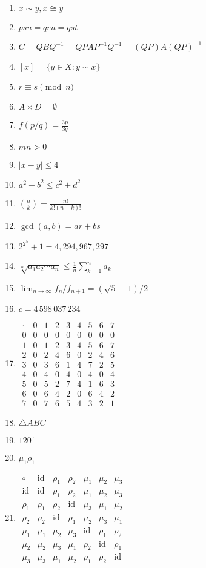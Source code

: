 \documentclass[oneside,10pt,]{article}
\newcommand{\identity}{\mathrm{id}}
\begin{document}
\begin{enumerate}
\item{}\(x \sim y, x\cong y\)%
\item{}\(psu = qru = qst\)%
\item{}\(C = QBQ^{-1} = QPAP^{-1} Q^{-1} = (QP)A(QP)^{-1}\)%
\item{}\([x] = \{ y \in X : y \sim x \}\)%
\item{}\(r \equiv s \pmod{ n}\)%
\item{}\(A \times D = \emptyset\)%
\item{}\(\displaystyle f(p/q) = \frac{3p}{3q}\)%
\item{}\(mn > 0\)%
\item{}\(|x - y| \leq 4\)%
\item{}\(a^2 + b^2 \leq c^2 + d^2\)%
\item{}\(\binom{n}{k} = \frac{n!}{k! (n - k)!}\)%
\item{}\(\gcd( a, b) = ar + bs\)%
\item{}\(2^{2^5} + 1 = 4{,}294{,}967{,}297\)%
\item{}\(\sqrt[n]{a_1 a_2 \cdots a_n} \leq \frac{1}{n} \sum_{k = 1}^{n} a_k\)%
\item{}\(\lim_{n \rightarrow \infty} f_n / f_{n + 1} = (\sqrt{5} - 1)/2\)%
\item{}\(c=4\,598\,037\,234\)%
\item{}\(\begin{array}{c|cccccccc} \cdot & 0 & 1 & 2 & 3 & 4 & 5 & 6 & 7 \\ \hline 0 & 0 & 0 & 0 & 0 & 0 & 0 & 0 & 0 \\ 1 & 0 & 1 & 2 & 3 & 4 & 5 & 6 & 7 \\ 2 & 0 & 2 & 4 & 6 & 0 & 2 & 4 & 6 \\ 3 & 0 & 3 & 6 & 1 & 4 & 7 & 2 & 5 \\ 4 & 0 & 4 & 0 & 4 & 0 & 4 & 0 & 4 \\ 5 & 0 & 5 & 2 & 7 & 4 & 1 & 6 & 3 \\ 6 & 0 & 6 & 4 & 2 & 0 & 6 & 4 & 2 \\ 7 & 0 & 7 & 6 & 5 & 4 & 3 & 2 & 1 \end{array}\)%
\item{}\(\bigtriangleup ABC\)%
\item{}\(120^{\circ}\)%
\item{}\(\mu_1 \rho_1\)%
\item{}\(\begin{array}{c|cccccc} \circ & \identity & \rho_1 & \rho_2 & \mu_1 & \mu_2 & \mu_3 \\ \hline \identity & \identity & \rho_1 & \rho_2 & \mu_1 & \mu_2 & \mu_3 \\ \rho_1 & \rho_1 & \rho_2 & \identity & \mu_3 & \mu_1 & \mu_2 \\ \rho_2 & \rho_2 & \identity & \rho_1 & \mu_2 & \mu_3 & \mu_1 \\ \mu_1 & \mu_1 & \mu_2 & \mu_3 & \identity & \rho_1& \rho_2\\ \mu_2 & \mu_2 & \mu_3 & \mu_1 & \rho_2 & \identity & \rho_1\\ \mu_3 & \mu_3 & \mu_1 & \mu_2 & \rho_1 & \rho_2& \identity \end{array}\)%

\end{enumerate}
\end{document}
